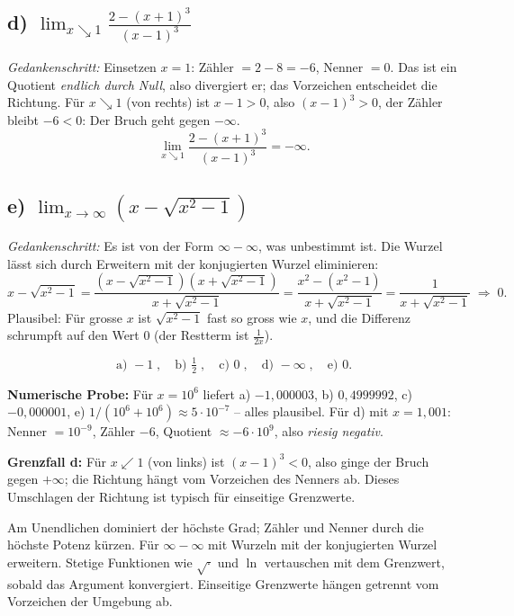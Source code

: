 \subsection*{d) $\displaystyle\lim_{x\searrow 1}\frac{2-(x+1)^3}{(x-1)^3}$}
\emph{Gedankenschritt:} Einsetzen $x=1$: Zähler $=2-8=-6$, Nenner $=0$.
Das ist ein Quotient \emph{endlich durch Null}, also divergiert er; das
Vorzeichen entscheidet die Richtung. Für $x\searrow 1$ (von rechts) ist
$x-1>0$, also $(x-1)^3>0$, der Zähler bleibt $-6<0$: Der Bruch geht gegen
$-\infty$.
\begin{equation*}
  \lim_{x\searrow 1}\frac{2-(x+1)^3}{(x-1)^3}=-\infty .
\end{equation*}

\subsection*{e) $\displaystyle\lim_{x\to\infty}\left(x-\sqrt{x^2-1}\right)$}
\emph{Gedankenschritt:} Es ist von der Form $\infty-\infty$, was
unbestimmt ist. Die Wurzel lässt sich durch Erweitern mit der konjugierten
Wurzel eliminieren:
\begin{equation*}
  x-\sqrt{x^2-1}
  =\frac{(x-\sqrt{x^2-1})(x+\sqrt{x^2-1})}{x+\sqrt{x^2-1}}
  =\frac{x^2-(x^2-1)}{x+\sqrt{x^2-1}}
  =\frac{1}{x+\sqrt{x^2-1}}\;\Rightarrow\;0 .
\end{equation*}
Plausibel: Für grosse $x$ ist $\sqrt{x^2-1}$ fast so gross wie $x$, und die
Differenz schrumpft auf den Wert $0$ (der Restterm ist $\frac{1}{2x}$).

\begin{ergebnis}
\begin{equation*}
  \text{a) } -1\;,\quad \text{b) } \tfrac12\;,\quad \text{c) } 0\;,\quad
  \text{d) } -\infty\;,\quad \text{e) } 0 .
\end{equation*}
\end{ergebnis}

\begin{kontrolle}
\textbf{Numerische Probe:} Für $x=10^6$ liefert a) $-1{,}000003$, b)
$0{,}4999992$, c) $-0{,}000001$, e) $1/(10^6+10^6)\approx5\cdot10^{-7}$ --
alles plausibel. Für d) mit $x=1{,}001$: Nenner $=10^{-9}$, Zähler $-6$,
Quotient $\approx -6\cdot10^9$, also \emph{riesig negativ}. \checkmark

\textbf{Grenzfall d:} Für $x\swarrow 1$ (von links) ist
$(x-1)^3<0$, also ginge der Bruch gegen $+\infty$; die Richtung hängt vom
Vorzeichen des Nenners ab. Dieses Umschlagen der Richtung ist typisch für
einseitige Grenzwerte. \checkmark
\end{kontrolle}

\begin{merksatz}
Am Unendlichen dominiert der höchste Grad; Zähler und Nenner durch die
höchste Potenz kürzen. Für $\infty-\infty$ mit Wurzeln mit der konjugierten
Wurzel erweitern. Stetige Funktionen wie $\sqrt{\cdot}$ und $\ln$
vertauschen mit dem Grenzwert, sobald das Argument konvergiert. Einseitige
Grenzwerte hängen getrennt vom Vorzeichen der Umgebung ab.
\end{merksatz}
